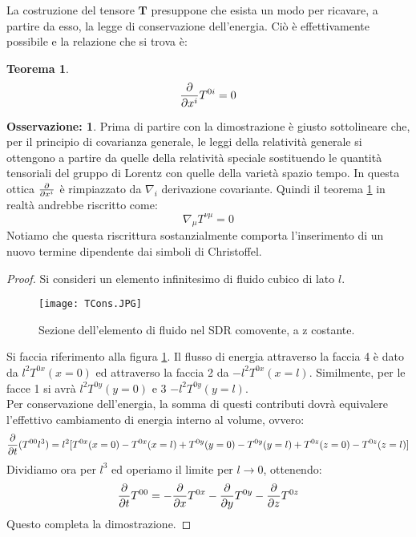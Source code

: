 \documentclass[]{report}
\theoremstyle{definition}
\theoremstyle{Theorem}
\newtheorem{Theo}[Def]{Teorema}
\theoremstyle{definition}
\theoremstyle{definition}
\theoremstyle{definition}
\newtheorem{Obs}[Def]{Osservazione:}
\begin{document}
La costruzione del tensore $\textbf{T}$ presuppone che esista un modo per ricavare, a partire da esso, la legge di conservazione dell'energia. Ciò è effettivamente possibile e la relazione che si trova è:
\begin{Theo} \label{Teo 2}
	$${\partial \over \partial x^i}T^{0i}=0$$	
\end{Theo}
\begin{Obs}
Prima di partire con la dimostrazione è giusto sottolineare che, per il principio di covarianza generale, le leggi della relatività generale si ottengono a partire da quelle della relatività speciale sostituendo le quantità tensoriali del gruppo di Lorentz con quelle della varietà spazio tempo. In questa ottica ${\partial \over \partial x^i}$ è rimpiazzato da $\nabla_i$ derivazione covariante. Quindi il teorema \ref{Teo 2} in realtà andrebbe riscritto come:
$$\nabla_\mu T^{\nu\mu}=0$$
Notiamo che questa riscrittura sostanzialmente comporta l'inserimento di un nuovo termine dipendente dai simboli di Christoffel.
\end{Obs}
\begin{proof}
	Si consideri un elemento infinitesimo di fluido cubico di lato $l$.
	\begin{figure} [H]
		\centering
		\label{Image 2}
		\texttt{[image: TCons.JPG]}
		\caption{Sezione dell'elemento di fluido nel SDR comovente, a z costante.}	
	\end{figure}
Si faccia riferimento alla figura \ref{Image 2}. Il flusso di energia attraverso la faccia 4 è dato da $l^2T^{0x}(x=0)$ ed attraverso la faccia 2 da $-l^2T^{0x}(x=l)$. Similmente, per le facce 1 si avrà $l^2T^{0y}(y=0)$ e 3 $-l^2T^{0y}(y=l)$.\\
Per conservazione dell'energia, la somma di questi contributi dovrà equivalere l'effettivo cambiamento di energia interno al volume, ovvero:
$${\partial \over \partial t}(T^{00}l^3)=l^2[T^{0x}(x=0)-T^{0x}(x=l)+T^{0y}(y=0)-T^{0y}(y=l)+T^{0z}(z=0)-T^{0z}(z=l)]$$
Dividiamo ora per $l^3$ ed operiamo il limite per $l\rightarrow 0$, ottenendo:
$${\partial \over \partial t}T^{00}=-{\partial \over \partial x}T^{0x}-{\partial \over \partial y}T^{0y}-{\partial \over \partial z}T^{0z}$$
Questo completa la dimostrazione.
\end{proof}
\end{document}

